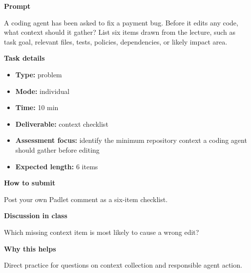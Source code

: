 \documentclass[11pt]{article}
\begin{document}
\begin{tcolorbox}[colback=white,colframe=MidnightBlue,title={Q2 Structured Problem},fonttitle=\bfseries,breakable]
\begin{center}
\end{center}

{\large\bfseries\color{MidnightBlue} Prompt}\par\medskip
A coding agent has been asked to fix a payment bug. Before it edits any code, what context should it gather? List six items drawn from the lecture, such as task goal, relevant files, tests, policies, dependencies, or likely impact area.

{\large\bfseries\color{MidnightBlue} Task details}\par\medskip
\begin{itemize}\item \textbf{Type:} problem
\item \textbf{Mode:} individual
\item \textbf{Time:} 10 min
\item \textbf{Deliverable:} context checklist
\item \textbf{Assessment focus:} identify the minimum repository context a coding agent should gather before editing
\item \textbf{Expected length:} 6 items\end{itemize}

{\large\bfseries\color{MidnightBlue} How to submit}\par\medskip
Post your own Padlet comment as a six-item checklist.

{\large\bfseries\color{MidnightBlue} Discussion in class}\par\medskip
Which missing context item is most likely to cause a wrong edit?

{\large\bfseries\color{MidnightBlue} Why this helps}\par\medskip
Direct practice for questions on context collection and responsible agent action.


\end{tcolorbox}
\end{document}
